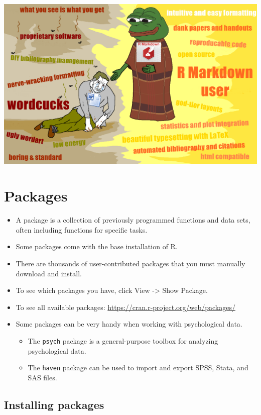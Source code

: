 \documentclass[
]{book}
\providecommand{\tightlist}{%
  \setlength{\itemsep}{0pt}\setlength{\parskip}{0pt}}
\begin{document}
\includegraphics{./img/rmarkdown_meme.png}

\section{Packages}\label{packages}

\begin{itemize}
\tightlist
\item
  A package is a collection of previously programmed functions and data sets, often including functions for specific tasks.
\item
  Some packages come with the base installation of R.
\item
  There are thousands of user-contributed packages that you must manually download and install.
\item
  To see which packages you have, click View -\textgreater{} Show Package.
\item
  To see all available packages: \url{https://cran.r-project.org/web/packages/}
\item
  Some packages can be very handy when working with psychological data.

  \begin{itemize}
  \tightlist
  \item
    The \texttt{psych} package is a general-purpose toolbox for analyzing psychological data.
  \item
    The \texttt{haven} package can be used to import and export SPSS, Stata, and SAS files.
  \end{itemize}
\end{itemize}

\subsection{Installing packages}\label{installing-packages}
\end{document}

